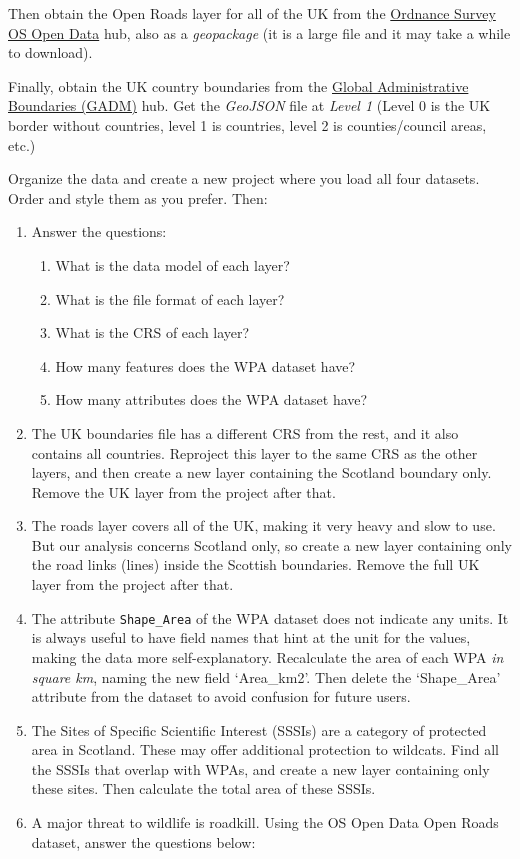 \documentclass[
  letterpaper,
  DIV=11,
  numbers=noendperiod]{scrreprt}
\providecommand{\tightlist}{%
  \setlength{\itemsep}{0pt}\setlength{\parskip}{0pt}}\usepackage{longtable,booktabs,array}
\begin{document}
Then obtain the Open Roads layer for all of the UK from the
\href{https://osdatahub.os.uk/downloads/open}{Ordnance Survey OS Open
Data} hub, also as a \emph{geopackage} (it is a large file and it may
take a while to download).

Finally, obtain the UK country boundaries from the
\href{https://gadm.org/data.html}{Global Administrative Boundaries
(GADM)} hub. Get the \emph{GeoJSON} file at \emph{Level 1} (Level 0 is
the UK border without countries, level 1 is countries, level 2 is
counties/council areas, etc.)

Organize the data and create a new project where you load all four
datasets. Order and style them as you prefer. Then:

\begin{enumerate}
\def\labelenumi{\arabic{enumi})}
\item
  Answer the questions:

  \begin{enumerate}
  \def\labelenumii{\alph{enumii})}
  \tightlist
  \item
    What is the data model of each layer?
  \item
    What is the file format of each layer?
  \item
    What is the CRS of each layer?
  \item
    How many features does the WPA dataset have?
  \item
    How many attributes does the WPA dataset have?
  \end{enumerate}
\item
  The UK boundaries file has a different CRS from the rest, and it also
  contains all countries. Reproject this layer to the same CRS as the
  other layers, and then create a new layer containing the Scotland
  boundary only. Remove the UK layer from the project after that.
\item
  The roads layer covers all of the UK, making it very heavy and slow to
  use. But our analysis concerns Scotland only, so create a new layer
  containing only the road links (lines) inside the Scottish boundaries.
  Remove the full UK layer from the project after that.
\item
  The attribute \texttt{Shape\_Area} of the WPA dataset does not
  indicate any units. It is always useful to have field names that hint
  at the unit for the values, making the data more self-explanatory.
  Recalculate the area of each WPA \emph{in square km}, naming the new
  field `Area\_km2'. Then delete the `Shape\_Area' attribute from the
  dataset to avoid confusion for future users.
\item
  The Sites of Specific Scientific Interest (SSSIs) are a category of
  protected area in Scotland. These may offer additional protection to
  wildcats. Find all the SSSIs that overlap with WPAs, and create a new
  layer containing only these sites. Then calculate the total area of
  these SSSIs.
\item
  A major threat to wildlife is roadkill. Using the OS Open Data Open
  Roads dataset, answer the questions below:


\end{enumerate}
\end{document}
